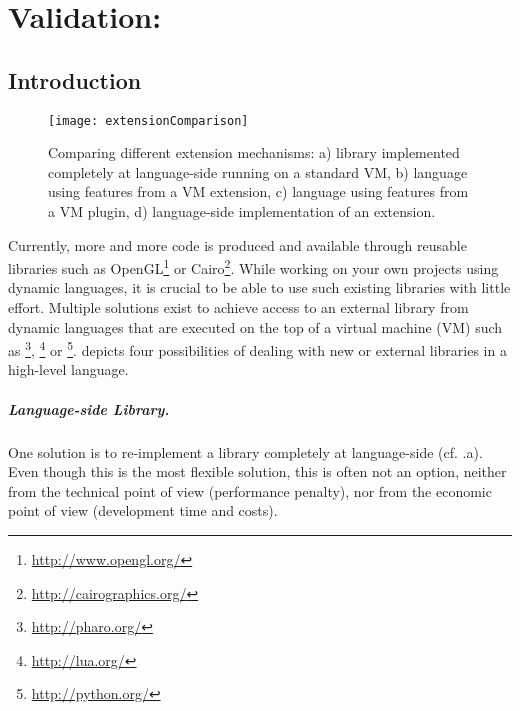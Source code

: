 

\chapter{Validation: \FFI}
\minitoc

\section{Introduction}

\begin{figure*}[ht]
	\centering
	\texttt{[image: extensionComparison]}
	\caption{Comparing different extension mechanisms: 
		a) library implemented completely at language-side running on a standard VM,
		b) language using features from a VM extension,
		c) language using features from a VM plugin,
		d) language-side implementation of an extension.}
\end{figure*}

Currently, more and more code is produced and available through reusable libraries such as OpenGL\footnote{\url{http://www.opengl.org/}} or Cairo\footnote{\url{http://cairographics.org/}}.
While working on your own projects using dynamic languages, it is crucial to be able to use such existing libraries with little effort.
Multiple solutions exist to achieve access to an external library from dynamic languages that are executed on the top of a virtual machine (VM) such as \PH\footnote{\url{http://pharo.org/}}, \Lua\footnote{\url{http://lua.org/}} or \Python\footnote{\url{http://python.org/}}.
 depicts four possibilities of dealing with new or external libraries in a high-level language.

\paragraph{Language-side Library.}
One solution is to re-implement a library completely at language-side (cf. .a).
Even though this is the most flexible solution, this is often not an option, neither from the technical point of view (performance penalty), nor from the economic point of view (development time and costs).

